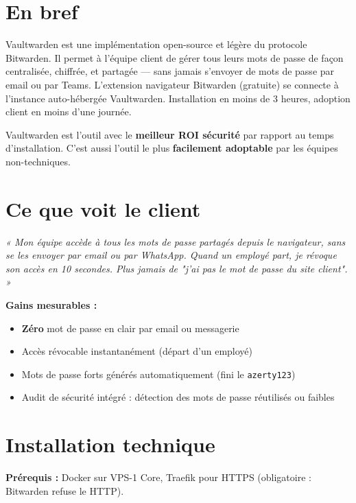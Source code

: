 \documentclass[11pt, a4paper]{article}
\begin{document}
\ficheHeader

\section*{En bref}
Vaultwarden est une implémentation open-source et légère du protocole Bitwarden. Il permet à l'équipe client de gérer tous leurs mots de passe de façon centralisée, chiffrée, et partagée — sans jamais s'envoyer de mots de passe par email ou par Teams. L'extension navigateur Bitwarden (gratuite) se connecte à l'instance auto-hébergée Vaultwarden. Installation en moins de 3 heures, adoption client en moins d'une journée.

\begin{pointcle}
  Vaultwarden est l'outil avec le \textbf{meilleur ROI sécurité} par rapport au temps d'installation. C'est aussi l'outil le plus \textbf{facilement adoptable} par les équipes non-techniques.
\end{pointcle}

\section{Ce que voit le client}

\begin{clientbox}
  \textit{« Mon équipe accède à tous les mots de passe partagés depuis le navigateur, sans se les envoyer par email ou par WhatsApp. Quand un employé part, je révoque son accès en 10 secondes. Plus jamais de "j'ai pas le mot de passe du site client". »}
\end{clientbox}

\textbf{Gains mesurables :}
\begin{itemize}
  \item \textbf{Zéro} mot de passe en clair par email ou messagerie
  \item Accès révocable instantanément (départ d'un employé)
  \item Mots de passe forts générés automatiquement (fini le \texttt{azerty123})
  \item Audit de sécurité intégré : détection des mots de passe réutilisés ou faibles
\end{itemize}

\section{Installation technique}

\textbf{Prérequis :} Docker sur VPS-1 Core, Traefik pour HTTPS (obligatoire : Bitwarden refuse le HTTP).
\end{document}

